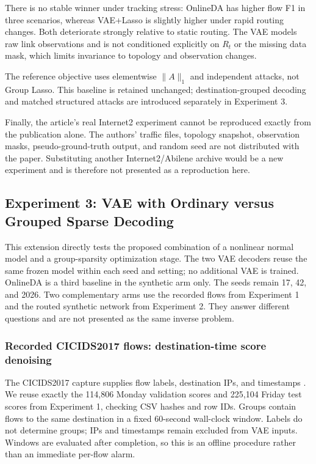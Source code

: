 \documentclass[12pt]{article}
\begin{document}
There is no stable winner under tracking stress: OnlineDA has higher flow F1 in
three scenarios, whereas VAE+Lasso is slightly higher under rapid routing
changes.  Both deteriorate strongly relative to static routing.  The VAE models
raw link observations and is not conditioned explicitly on $R_t$ or the missing
data mask, which limits invariance to topology and observation changes.

The reference objective uses elementwise $\|A\|_1$ and independent attacks, not
Group Lasso. This baseline is retained unchanged; destination-grouped decoding
and matched structured attacks are introduced separately in Experiment 3.

Finally, the article's real Internet2 experiment cannot be reproduced exactly
from the publication alone.  The authors' traffic files, topology snapshot,
observation masks, pseudo-ground-truth output, and random seed are not distributed
with the paper.  Substituting another Internet2/Abilene archive would be a new
experiment and is therefore not presented as a reproduction here.

\subsection{Experiment 3: VAE with Ordinary versus Grouped Sparse Decoding}

This extension directly tests the proposed combination of a nonlinear normal
model and a group-sparsity optimization stage. The two VAE decoders reuse the
same frozen model within each seed and setting; no additional VAE is trained.
OnlineDA is a third baseline in the synthetic arm only. The
seeds remain 17, 42, and 2026. Two complementary arms use the recorded flows
from Experiment 1 and the routed synthetic network from Experiment 2. They
answer different questions and are not presented as the same inverse problem.

\subsubsection{Recorded CICIDS2017 flows: destination-time score denoising}

The CICIDS2017 capture supplies flow labels, destination IPs, and timestamps
\cite{CICIDS2017}. We reuse exactly the 114,806 Monday validation scores and
225,104 Friday test scores from Experiment 1, checking CSV hashes and row IDs.
Groups contain flows to the same destination in a fixed 60-second wall-clock
window. Labels do not determine groups; IPs and timestamps remain excluded from
VAE inputs. Windows are evaluated after completion, so this is an offline
procedure rather than an immediate per-flow alarm.
\end{document}

